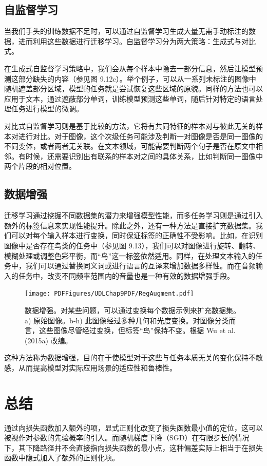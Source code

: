 \documentclass[lang=cn,newtx,10pt,scheme=chinese]{elegantbook}
\begin{document}
\subsection{自监督学习}
当我们手头的训练数据不足时，可以通过自监督学习生成大量无需手动标注的数据，进而利用这些数据进行迁移学习。自监督学习分为两大策略：生成式与对比式。

在生成式自监督学习策略中，我们会从每个样本中隐去一部分信息，然后让模型预测这部分缺失的内容（参见图 9.12c）。举个例子，可以从一系列未标注的图像中随机遮盖部分区域，模型的任务就是尝试恢复这些区域的原貌。同样的方法也可以应用于文本，通过遮蔽部分单词，训练模型预测这些单词，随后针对特定的语言处理任务进行模型的微调。

对比式自监督学习则是基于比较的方法，它将有共同特征的样本对与彼此无关的样本对进行对比。对于图像，这个次级任务可能涉及判断一对图像是否是同一图像的不同变体，或者两者无关联。在文本领域，可能需要判断两个句子是否在原文中相邻。有时候，还需要识别出有联系的样本对之间的具体关系，比如判断同一图像中两个片段的相对位置。
\subsection{数据增强}
迁移学习通过挖掘不同数据集的潜力来增强模型性能，而多任务学习则是通过引入额外的标签信息来实现性能提升。除此之外，还有一种方法是直接扩充数据集。我们可以对每个输入样本进行变换，同时保证标签的正确性不受影响。比如，在识别图像中是否存在鸟类的任务中（参见图 9.13），我们可以对图像进行旋转、翻转、模糊处理或调整色彩平衡，而“鸟”这一标签依然适用。同样，在处理文本输入的任务中，我们可以通过替换同义词或进行语言的互译来增加数据多样性。而在音频输入的任务中，改变不同频率范围内的音量也是一种有效的数据增强手段。

\begin{figure}[ht!]
	\centering
	\texttt{[image: PDFFigures/UDLChap9PDF/RegAugment.pdf]}
	\caption{数据增强。对某些问题，可以通过变换每个数据示例来扩充数据集。a) 原始图像。b-h) 此图像经过多种几何和光度变换。对图像分类而言，这些图像尽管经过变换，但标签“鸟”保持不变。根据 Wu et al. (2015a) 改编。}
\end{figure}


这种方法称为数据增强，目的在于使模型对于这些与任务本质无关的变化保持不敏感，从而提高模型对实际应用场景的适应性和鲁棒性。

\section{总结}
通过向损失函数加入额外的项，显式正则化改变了损失函数最小值的定位，这可以被视作对参数的先验概率的引入。而随机梯度下降（SGD）在有限步长的情况下，其下降路径并不会直接指向损失函数的最小点，这种偏差实际上相当于在损失函数中隐式加入了额外的正则化项。
\end{document}
